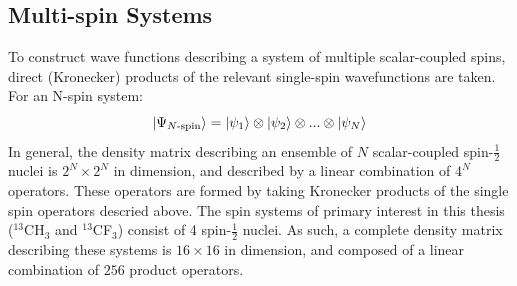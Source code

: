 \subsection{Multi-spin Systems}
To construct wave functions describing a system of multiple scalar-coupled spins, direct (Kronecker) products of the relevant single-spin wavefunctions are taken. For an N-spin system:
\begin{equation}
\ket{\Psi_{N\text{-spin}}} = \ket{\psi_1} \otimes \ket{\psi_2} \otimes ... \otimes \ket{\psi_N}
\end{equation}
In general, the density matrix describing an ensemble of $N$ scalar-coupled spin-$\frac{1}{2}$ nuclei is $2^N \times 2^N$ in dimension, and described by a linear combination of $4^N$ operators. These operators are formed by taking Kronecker products of the single spin operators descried above.
The spin systems of primary interest in this thesis ($^{13}$CH$_3$ and $^{13}$CF$_3$) consist of 4 spin-$\frac{1}{2}$ nuclei. As such, a complete density matrix describing these systems is $16 \times 16$ in dimension, and composed of a linear combination of $256$ product operators.
